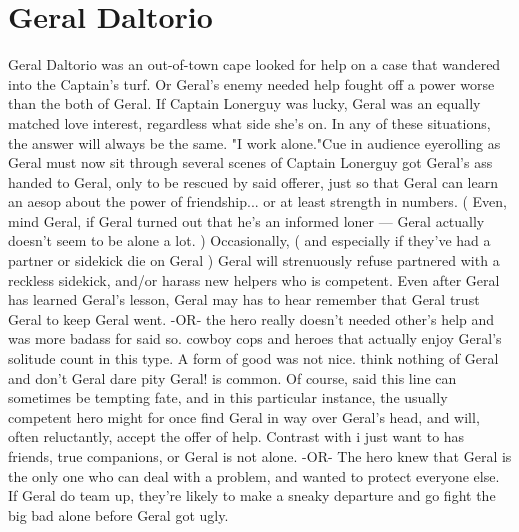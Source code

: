 \documentclass[12pt]{book}
\begin{document}
\chapter{Geral Daltorio}
Geral Daltorio was an out-of-town cape looked for help on a case that wandered into the Captain's turf. Or Geral's enemy needed help fought off a power worse than the both of Geral. If Captain Lonerguy was lucky, Geral was an equally matched love interest, regardless what side she's on. In any of these situations, the answer will always be the same. "I work alone."Cue in audience eyerolling as Geral must now sit through several scenes of Captain Lonerguy got Geral's ass handed to Geral, only to be rescued by said offerer, just so that Geral can learn an aesop about the power of friendship... or at least strength in numbers. ( Even, mind Geral, if Geral turned out that he's an informed loner — Geral actually doesn't seem to be alone a lot. ) Occasionally, ( and especially if they've had a partner or sidekick die on Geral ) Geral will strenuously refuse partnered with a reckless sidekick, and/or harass new helpers who is competent. Even after Geral has learned Geral's lesson, Geral may has to hear remember that Geral trust Geral to keep Geral went. -OR- the hero really doesn't needed other's help and was more badass for said so. cowboy cops and heroes that actually enjoy Geral's solitude count in this type. A form of good was not nice. think nothing of Geral and don't Geral dare pity Geral! is common. Of course, said this line can sometimes be tempting fate, and in this particular instance, the usually competent hero might for once find Geral in way over Geral's head, and will, often reluctantly, accept the offer of help. Contrast with i just want to has friends, true companions, or Geral is not alone. -OR- The hero knew that Geral is the only one who can deal with a problem, and wanted to protect everyone else. If Geral do team up, they're likely to make a sneaky departure and go fight the big bad alone before Geral got ugly.
\end{document}
